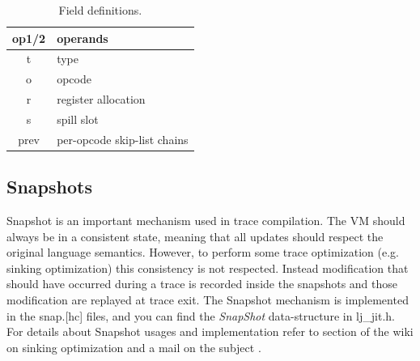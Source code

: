 \begin{table}[H]
\centering
\caption{Field definitions.}
\label{tab:ir-field}
\begin{tabular}{|c|l|}
\hline
op1/2 & operands                    \\ \hline
t     & type                        \\ \hline
o     & opcode                      \\ \hline
r     & register allocation         \\ \hline
s     & spill slot                  \\ \hline
prev  & per-opcode skip-list chains \\ \hline
\end{tabular}
\end{table}


\subsection{Snapshots}
\label{Subsec:snap}

Snapshot is an important mechanism used in trace compilation. The VM should
always be in a consistent state, meaning that all updates should respect the
original language semantics. However, to perform some trace optimization
(e.g. sinking optimization) this consistency is not respected. Instead
modification that should have occurred during a trace is recorded inside the
snapshots and those modification are replayed at trace exit. The Snapshot
mechanism is implemented in the snap.[hc] files, and you can find the
\emph{SnapShot} data-structure in lj\_jit.h. For details about
Snapshot usages and implementation refer to section of the wiki on sinking
optimization \cite{luajit-sink} and a mail on the subject \cite{luajit-mail-1}.
